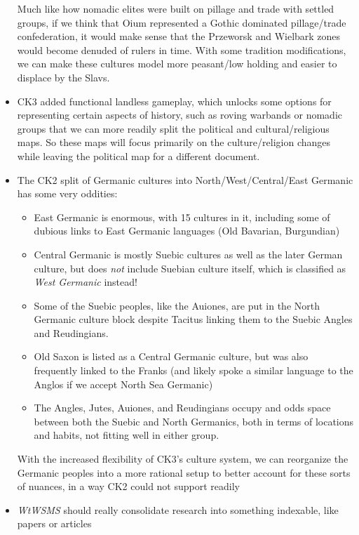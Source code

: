 \documentclass{article}
\begin{document}
\begin{itemize}
		Much like how nomadic elites were built on pillage and trade with settled groups, if we think that Oium represented a Gothic dominated pillage/trade confederation, it would make sense that the Przeworsk and Wielbark zones would become denuded of rulers in time.
		With some tradition modifications, we can make these cultures model more peasant/low holding and easier to displace by the Slavs.
		\item CK3 added functional landless gameplay, which unlocks some options for representing certain aspects of history, such as roving warbands or nomadic groups that we can more readily split the political and cultural/religious maps.
		So these maps will focus primarily on the culture/religion changes while leaving the political map for a different document.
		\item The CK2 split of Germanic cultures into North/West/Central/East Germanic has some very oddities:
		\begin{itemize}
			\item East Germanic is enormous, with 15 cultures in it, including some of dubious links to East Germanic languages (Old Bavarian, Burgundian)
			\item Central Germanic is mostly Suebic cultures as well as the later German culture, but does \textit{not} include Suebian culture itself, which is classified as \textit{West Germanic} instead!
			\item Some of the Suebic peoples, like the Auiones, are put in the North Germanic culture block despite Tacitus linking them to the Suebic Angles and Reudingians.
			\item Old Saxon is listed as a Central Germanic culture, but was also frequently linked to the Franks (and likely spoke a similar language to the Anglos if we accept North Sea Germanic)
			\item The Angles, Jutes, Auiones, and Reudingians occupy and odds space between both the Suebic and North Germanics, both in terms of locations and habits, not fitting well in either group.
		\end{itemize}
		With the increased flexibility of CK3's culture system, we can reorganize the Germanic peoples into a more rational setup to better account for these sorts of nuances, in a way CK2 could not support readily
		\item \textit{WtWSMS} should really consolidate research into something indexable, like papers or articles
	\end{itemize}
	
\end{document}
